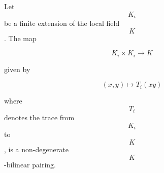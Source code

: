 Let $$K_i$$ be a finite extension of the local field $$K$$. The map

$$K_i \times K_i \to K$$

given by

$$(x, y) \mapsto T_i(xy)$$

where $$T_i$$ denotes the trace from $$K_i$$ to $$K$$, is a non-degenerate $$K$$-bilinear pairing.
